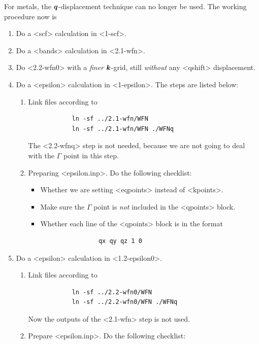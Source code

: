 \documentclass[hyperref, a4paper, 12pt]{report}
\def\texttt#1{<#1>}%
\newcommand{\shortcode}[1]{\texttt{#1}}
\begin{document}
For metals, the $\vb*{q}$-displacement technique can no longer be used.
The working procedure now is 
\begin{enumerate}
    \item Do a \shortcode{scf} calculation in \shortcode{1-scf}.
    \item Do a \shortcode{bands} calculation in \shortcode{2.1-wfn}.
    \item Do \shortcode{2.2-wfn0} with a \emph{finer} $\vb*{k}$-grid,
    still \emph{without} any \shortcode{qshift} displacement.
    \item Do a \shortcode{epsilon} calculation in \shortcode{1-epsilon}. The steps are listed below:
    \begin{enumerate}
        \item Link files according to 
        \begin{lstlisting}
            ln -sf ../2.1-wfn/WFN
            ln -sf ../2.1-wfn/WFN ./WFNq
        \end{lstlisting}
        The \shortcode{2.2-wfnq} step is not needed,
        because we are not going to deal with the $\Gamma$ point in this step.
        \item Preparing \shortcode{epsilon.inp}. Do the following checklist:
        \begin{itemize}
            \item Whether we are setting \shortcode{eqpoints} instead of \shortcode{kpoints}.
            \item Make sure the $\Gamma$ point is \emph{not} included in the \shortcode{qpoints} block.
            \item Whether each line of the \shortcode{qpoints} block is in the format 
            \begin{lstlisting}
                qx qy qz 1 0
            \end{lstlisting}
        \end{itemize}
    \end{enumerate}
    \item Do a \shortcode{epsilon} calculation in \shortcode{1.2-epsilon0}. 
    \begin{enumerate}
        \item Link files according to 
        \begin{lstlisting}
            ln -sf ../2.2-wfn0/WFN
            ln -sf ../2.2-wfn0/WFN ./WFNq
        \end{lstlisting}
        Now the outputs of the \shortcode{2.1-wfn} step is not used.
        \item Prepare \shortcode{epsilon.inp}. Do the following checklist:

\end{enumerate}
\end{enumerate}
\end{document}
